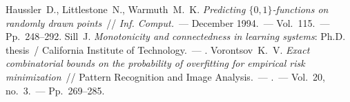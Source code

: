 \documentclass{article} %
\begin{document}
%
%

\begin{thebibliography}{1}
    {Haussler~D., Littlestone~N., Warmuth~M.~K.} 
    \emph{Predicting   $\{0,1\}$-functions on randomly drawn points}~// \emph{Inf. Comput.}~---
    \newblock December 1994.~---
    \newblock Vol.~115.~---
    \newblock Pp.~248--292.
    {Sill~J.}
    \emph{Monotonicity and connectedness in learning systems}: Ph.D. thesis~/ California Institute of Technology.~---
    .
    {Vorontsov~K.~V.} 
    \emph{Exact combinatorial bounds on the probability of overfitting for empirical risk minimization}~// 
    {Pattern Recognition and Image Analysis}.~---
    .~---
    \newblock Vol.~20, no.~3.~---
    \newblock Pp.~269--285.
\end{thebibliography}
\end{document}
